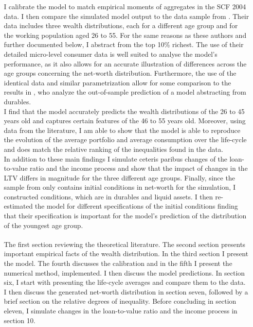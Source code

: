 \documentclass[a4paper,12pt,legno]{article}
\begin{document}
I calibrate the model to match empirical moments of aggregates in the SCF 2004 data. I then compare the simulated model output to the data sample from \cite{hintermaier2011}. Their data includes three wealth distributions, each for a different age group and for the working population aged 26 to 55. For the same reasons as these authors and further documented below, I abstract from the top 10\% richest. The use of their detailed micro-level consumer data is well suited to analyse the model's performance, as it also allows for an accurate illustration of differences across the age groups concerning the net-worth distribution. Furthermore, the use of the identical data and similar parametrization allow for some comparison to the results in \cite{hintermaier2011}, who analyze the out-of-sample prediction of a model abstracting from durables.\\
I find that the model accurately predicts the wealth distributions of the 26 to 45 years old and captures certain features of the 46 to 55 years old. Moreover, using data from the literature, I am able to show that the model is able to reproduce the evolution of the average portfolio and average consumption over the life-cycle and does match the relative ranking of the inequalities found in the data. 
\\ 
In addition to these main findings I simulate ceteris paribus changes of the loan-to-value ratio and the income process and show that the impact of changes in the LTV differs in magnitude for the three different age groups. Finally, since the sample from \cite{hintermaier2011} only contains initial conditions in net-worth for the simulation, I constructed conditions, which are in durables and liquid assets. I then re-estimated the model for different specifications of the initial conditions finding that their specification is important for the model's prediction of the distribution of the youngest age group. 
\\ \\
The first section reviewing the theoretical literature. The second section presents important empirical facts of the wealth distribution. In the third section I present the model. The fourth discusses the calibration and in the fifth I present the numerical method, implemented. I then discuss the model predictions. In section six, I start with presenting the life-cycle averages and compare them to the data. I then discuss the generated net-worth distribution in section seven, followed by a brief section on the relative degrees of inequality. Before concluding in section eleven, I simulate changes in the loan-to-value ratio and the income process in section 10.
\end{document}
